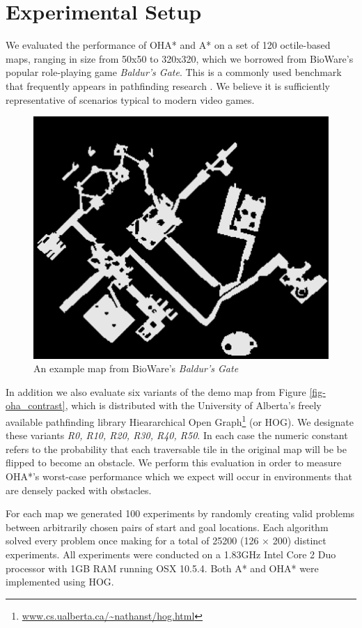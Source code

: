 \section{Experimental Setup}
We evaluated the performance of OHA* and A* on a set of 120 octile-based maps, ranging in size from 50x50 
to 320x320, which we borrowed from BioWare's popular role-playing game \emph{Baldur's Gate}. 
This is a commonly used benchmark that frequently appears in pathfinding research 
\cite{botea04,bjornsson05,bjornsson06,sturtevant05,harabor08}.
We believe it is sufficiently representative of scenarios typical to modern video games. 
\begin{figure}[htbp]
       \begin{center}
                       \includegraphics[scale=0.50, trim = 10mm 10mm 10mm 0mm]{diagrams/bgmap.png}
       \end{center}
	\vspace{-3pt}
       \caption{An example map from BioWare's \emph{Baldur's Gate}}
       \label{fig-bgmap}
	\vspace{-12pt}
\end{figure}
In addition we also evaluate six variants of the demo map from Figure \ref{fig-oha_contrast},
 which is distributed with the University of Alberta's freely available pathfinding library 
Hieararchical Open Graph\footnote{\url{www.cs.ualberta.ca/~nathanst/hog.html}} (or HOG).
We designate these variants \emph{R0, R10, R20, R30, R40, R50}.
In each case the numeric constant refers to the probability that each traversable tile 
in the original map will be be flipped to become an obstacle.
We perform this evaluation in order to measure OHA*'s worst-case performance which we expect will occur in 
environments that are densely packed with obstacles.
\par
For each map we generated 100 experiments by randomly creating valid problems between arbitrarily chosen 
pairs of start and goal locations.
Each algorithm solved every problem once making for a total of 25200 (126 $\times$ 200) distinct experiments.
All experiments were conducted on a 1.83GHz Intel Core 2 Duo processor with 1GB RAM running OSX 10.5.4.
Both A* and OHA* were implemented using HOG. 
